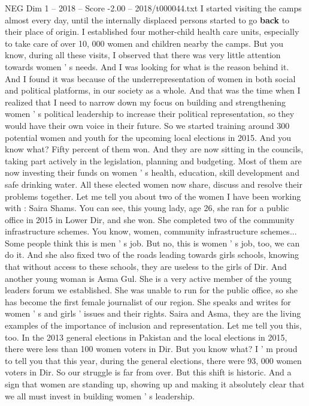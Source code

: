 \begin{textsample}{NEG Dim 1 – 2018 – Score -2.00 – 2018/t000044.txt}
I started visiting the camps almost every day, until the internally displaced persons started to go \textbf{back} to their place of origin.
I established four mother-child health care units, especially to take care of over 10, 000 women and children nearby the camps.
But you know, during all these visits, I observed that there was very little attention towards women ' s needs.
And I was looking for what is the reason behind it.
And I found it was because of the underrepresentation of women in both social and political platforms, in our society as a whole.
And that was the time when I realized that I need to narrow down my focus on building and strengthening women ' s political leadership to increase their political representation, so they would have their own voice in their future.
So we started training around 300 potential women and youth for the upcoming local elections in 2015.
And you know what?
Fifty percent of them won.
And they are now sitting in the councils, taking part actively in the legislation, planning and budgeting.
Most of them are now investing their funds on women ' s health, education, skill development and safe drinking water.
All these elected women now share, discuss and resolve their problems together.
Let me tell you about two of the women I have been working with : Saira Shams.
You can see, this young lady, age 26, she ran for a public office in 2015 in Lower Dir, and she won.
She completed two of the community infrastructure schemes.
You know, women, community infrastructure schemes...
Some people think this is men ' s job.
But no, this is women ' s job, too, we can do it.
And she also fixed two of the roads leading towards girls schools, knowing that without access to these schools, they are useless to the girls of Dir.
And another young woman is Asma Gul.
She is a very active member of the young leaders forum we established.
She was unable to run for the public office, so she has become the first female journalist of our region.
She speaks and writes for women ' s and girls ' issues and their rights.
Saira and Asma, they are the living examples of the importance of inclusion and representation.
Let me tell you this, too.
In the 2013 general elections in Pakistan and the local elections in 2015, there were less than 100 women voters in Dir.
But you know what?
I ' m proud to tell you that this year, during the general elections, there were 93, 000 women voters in Dir.
So our struggle is far from over.
But this shift is historic.
And a sign that women are standing up, showing up and making it absolutely clear that we all must invest in building women ' s leadership.

\end{textsample}
